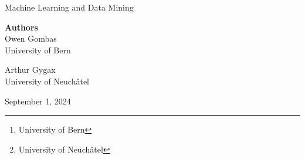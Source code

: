 % 

\title{\documenttitle}
\author{Owen Gombas\thanks{University of Bern}, Arthur Gygax\thanks{University of Neuchâtel}}
\affil{\organizations}
\date{\deliverydate}


\begin{titlepage}

\sffamily

{%
\Large%
\noindent%
\justifying%
Machine Learning and Data Mining\\
}

\vfill

{%
\noindent%
\Huge%
\textbf{\documenttitle}%
}

\vspace{0.75cm}

{%
\raggedright%
\normalsize%
\textbf{Authors}\\
\vspace{0.1cm}%
\Large%
Owen Gombas\\
\vspace{0.1cm}%
\normalsize%
University of Bern
}

\vspace{0.2cm}

{%
\raggedright%
\normalsize%
\Large%
Arthur Gygax\\
\vspace{0.1cm}%
\normalsize%
University of Neuchâtel
}

\vspace{1cm}
\vfill

{%
\Large
\noindent
September 1, 2024
}
\end{titlepage}

\nocite{*}

\setcounter{footnote}{0}%
\renewcommand*{\thefootnote}{\arabic{footnote}}

\tableofcontents{}




%











%


